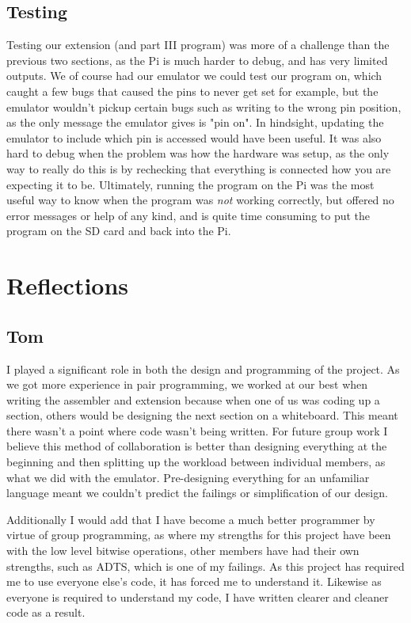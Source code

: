 \documentclass[a4paper]{article}
\begin{document}
\subsection{Testing}

Testing our extension (and part III program) was more of a challenge than the previous two sections, as the Pi is much harder to debug, and has very limited outputs.
We of course had our emulator we could test our program on, which caught a few bugs that caused the pins to never get set for example, but the emulator wouldn't pickup certain bugs such as writing to the wrong pin position, as the only message the emulator gives is "pin on". In hindsight, updating the emulator to include which pin is accessed would have been useful.
It was also hard to debug when the problem was how the hardware was setup, as the only way to really do this is by rechecking that everything is connected how you are expecting it to be.
Ultimately, running the program on the Pi was the most useful way to know when the program was \textit{not} working correctly, but offered no error messages or help of any kind, and is quite time consuming to put the program on the SD card and back into the Pi.

\section{Reflections}

\subsection{Tom}

I played a significant role in both the design and programming of the project. As we got more experience in pair programming, we worked at our best when writing the assembler and extension because when one of us was coding up a section, others would be designing the next section on a whiteboard. This meant there wasn't a point where code wasn't being written. For future group work I believe this method of collaboration is better than designing everything at the beginning and then splitting up the workload between individual members, as what we did with the emulator. Pre-designing everything for an unfamiliar language meant we couldn't predict the failings or simplification of our design.

Additionally I would add that I have become a much better programmer by virtue of group programming, as where my strengths for this project have been with the low level bitwise operations, other members have had their own strengths, such as ADTS, which is one of my failings. As this project has required me to use everyone else's code, it has forced me to understand it. Likewise as everyone is required to understand my code, I have written clearer and cleaner code as a result.
\end{document}
